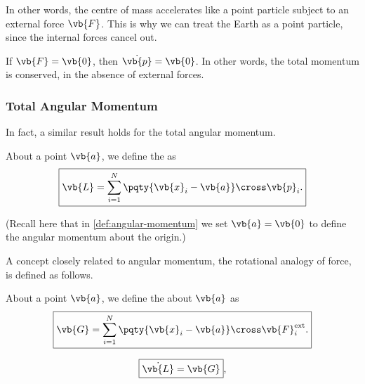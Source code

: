 In other words, the centre of mass accelerates like a point particle subject to an external force \(\vb{F}\). This is why we can treat the Earth as a point particle, since the internal forces cancel out.

\begin{corollary}
    \label{cor:conservation-of-momentum}%
    If \(\vb{F} = \vb{0}\), then \(\dot{\vb{p}} = \vb{0}\). In other words, the total momentum is conserved, in the absence of external forces.
\end{corollary}

\subsubsection{Total Angular Momentum}

In fact, a similar result holds for the total angular momentum.

\begin{definition}
    \label{def:angular-momentum-about-point}%
    About a point \(\vb{a}\), we define the  as
    \begin{equation}
        \boxed{\vb{L} = \sum_{i = 1}^{N} \pqty{\vb{x}_i - \vb{a}} \cross \vb{p}_i.}
    \end{equation}
\end{definition}

(Recall here that in \autoref{def:angular-momentum} we set \(\vb{a} = \vb{0}\) to define the angular momentum about the origin.)

A concept closely related to angular momentum, the rotational analogy of force, is defined as follows.

\begin{definition}
    \label{def:torque-about-point}%
    About a point \(\vb{a}\), we define the  about \(\vb{a}\) as
    \begin{equation}
        \boxed{\vb{G} = \sum_{i = 1}^{N} \pqty{\vb{x}_i - \vb{a}} \cross \vb{F}_i^{\text{ext}}.}
    \end{equation}
\end{definition}

\begin{proposition}
    \label{prop:torque-rate-of-change-angular-momentum}%
    \begin{equation}
        \boxed{\dot{\vb{L}} = \vb{G}},
    \end{equation}
\end{proposition}

